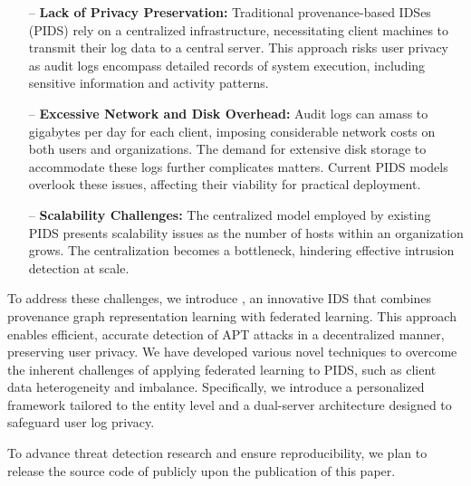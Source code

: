 \begin{itemize} [leftmargin=*]
    \item[--] \textbf{Lack of Privacy Preservation:} Traditional provenance-based IDSes (PIDS)  rely on a centralized infrastructure, necessitating client machines to transmit their log data to a central server.  This approach risks user privacy as audit logs encompass detailed records of system execution, including sensitive information and activity patterns.
    
    \item[--] \textbf{Excessive Network and Disk Overhead:} Audit logs can amass to gigabytes per day for each client, imposing considerable network costs on both users and organizations. The demand for extensive disk storage to accommodate these logs further complicates matters. Current PIDS models overlook these issues, affecting their viability for practical deployment.  
    
    \item[--] \textbf{Scalability Challenges:} The centralized model employed by existing PIDS presents scalability issues as the number of hosts within an organization grows. The centralization becomes a bottleneck, hindering effective intrusion detection at scale. 
\end{itemize}

To address these challenges, we introduce \Sys, an innovative IDS that combines provenance graph representation learning with federated learning. This approach enables efficient, accurate detection of APT attacks in a decentralized manner, preserving user privacy. We have developed various novel techniques to overcome the inherent challenges of applying federated learning to PIDS, such as client data heterogeneity and imbalance. Specifically, we introduce a personalized \gnnshort framework tailored to the entity level and a dual-server architecture designed to safeguard user log privacy.








 To advance threat detection research and ensure reproducibility, we plan to release the source code of \Sys publicly upon the publication of this paper.